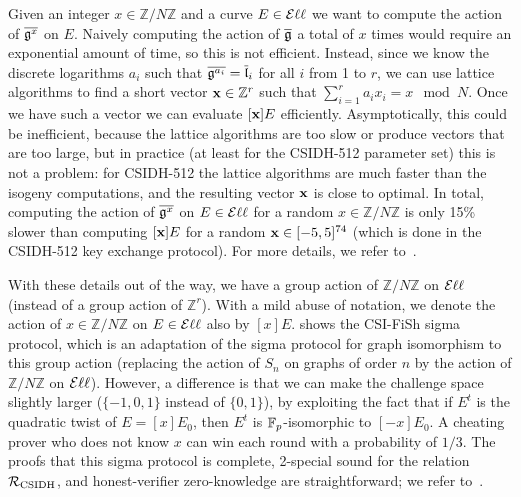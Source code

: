 Given an integer $x \in \mathbb{Z}/ N \mathbb{Z}$ and a curve $E \in \Ell$ we want to compute the action of $\overline{\fg^x}$ on $E$. Naively computing the action of $\overline{\fg}$ a total of $x$ times would require an exponential amount of time, so this is not efficient. Instead, since we know the discrete logarithms $a_i$ such that $\overline{\fg^{a_i}} = \overline{\fl}_i$ for all $i$ from 1 to $r$, we can use lattice algorithms to find a short vector $\bx \in \mathbb{Z}^r$ such that $\sum_{i=1}^r a_i x_i = x \mod N$. Once we have such a vector we can evaluate $[\bx]E$ efficiently. Asymptotically, this could be inefficient, because the lattice algorithms are too slow or produce vectors that are too large, but in practice (at least for the CSIDH-512 parameter set) this is not a problem: for CSIDH-512 the lattice algorithms are much faster than the isogeny computations, and the resulting vector $\bx$ is close to optimal. In total, computing the action of $\overline{\fg^x}$ on $E \in \Ell$ for a random $x \in \mathbb{Z}/ N \mathbb{Z}$ is only 15\% slower than computing $[\bx]E$ for a random $\bx \in [-5,5]^{74}$ (which is done in the CSIDH-512 key exchange protocol). For more details, we refer to~\cite{CSI-FiSh}.

With these details out of the way, we have a group action of $\mathbb{Z}/ N \mathbb{Z}$ on $\Ell$ (instead of a group action of $\mathbb{Z}^r$). With a mild abuse of notation, we denote the action of $x \in \mathbb{Z}/ N \mathbb{Z}$ on $E \in \Ell$ also by $[x]E$.  shows the CSI-FiSh sigma protocol, which is an adaptation of the sigma protocol for graph isomorphism to this group action (replacing the action of $S_n$ on graphs of order $n$ by the action of $\mathbb{Z}/ N \mathbb{Z}$ on $\Ell$). However, a difference is that we can make the challenge space slightly larger ($\{-1,0,1\}$ instead of $\{0,1\}$), by exploiting the fact that if $E^t$ is the quadratic twist of $E = [x]E_0$, then $E^t$ is $\Field_p$-isomorphic to $[-x]E_0$. A cheating prover who does not know $x$ can win each round with a probability of $1/3$. The proofs that this sigma protocol is complete, 2-special sound for the relation $\R[CSIDH]$,  and honest-verifier zero-knowledge are 
straightforward; 
we refer to~\cite{CSI-FiSh}.

